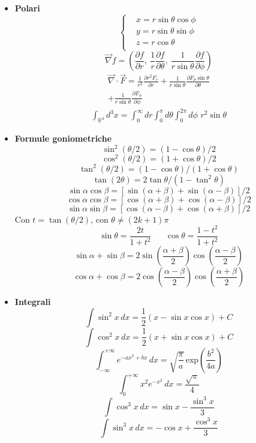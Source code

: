 \documentclass{article}
\begin{document}
\begin{footnotesize}
\begin{multicols*}{3}
\begin{itemize}[leftmargin=*]
	\item \textbf{Polari}
		\[
			\left\{\begin{aligned}
				&x= r\sin\theta \cos\phi\\ 
				&y= r\sin\theta \sin\phi \\
				&z= r\cos\theta \\
			\end{aligned}\right.
		\]
		\[\vec{\nabla} f = \left(\frac{\partial f}{\partial r},\ \frac{1}{r}\frac{\partial f}{\partial \theta },\ \frac{1}{r\sin\theta}\frac{\partial f}{\partial \phi }\right)\]
		\begin{align*}\vec{\nabla} \cdot \vec{F} = \frac{1}{r^2}\frac{\partial r^2F_r}{\partial r} + \frac{1}{r\sin\theta }\frac{\partial F_\theta \sin\theta }{\partial \theta }\\ + \frac{1}{r\sin\theta }\frac{\partial F_\phi }{\partial \phi }\end{align*}
		\begin{align*}\int_{\mathbb{R}^3}d^3x = \int_{0}^{\infty }dr \int_{0}^{\pi }d\theta  \int_{0}^{2\pi }d\phi \,\, r^2 \sin\theta \end{align*}

	\item \textbf{Formule goniometriche}
		\[\sin^2(\theta /2) = (1-\cos\theta )/2\]
		\[\cos^2(\theta /2) = (1+\cos\theta )/2\]
		\[\tan^2(\theta /2) = (1-\cos\theta )/(1+\cos\theta )\]
		\[\tan(2\theta ) = 2\tan\theta /(1-\tan^2\theta )\]
		\[\sin\alpha \cos\beta = [\sin(\alpha +\beta )+\sin(\alpha -\beta )]/2\]
		\[\cos\alpha \cos\beta = [\cos(\alpha +\beta )+\cos(\alpha -\beta )]/2\]
		\[\sin\alpha \sin\beta = [\cos(\alpha -\beta )+\cos(\alpha +\beta )]/2\]
		Con $t=\tan(\theta  /2)$, con $\theta \neq (2k+1)\pi $
		\[\sin\theta = \frac{2t}{1+t^2} \hspace{20pt}\cos\theta = \frac{1-t^2}{1+t^2}\]
		\[\sin\alpha +\sin\beta  = 2\sin\left(\frac{\alpha +\beta }{2}\right)\cos\left(\frac{\alpha -\beta }{2}\right)\]
		\[\cos\alpha +\cos\beta  = 2\cos\left(\frac{\alpha -\beta }{2}\right)\cos\left(\frac{\alpha +\beta }{2}\right)\]

	\item \textbf{Integrali}
		\[\int \sin^2 x \,dx = \frac{1}{2}(x-\sin x\cos x) + C\]
		\[\int \cos^2 x \,dx = \frac{1}{2}(x+\sin x\cos x) + C\]
		\[\int_{-\infty }^{+\infty } e^{-ax^2+bx}\,dx = \sqrt{\frac{\pi }{a}}\, \mathrm{exp}\left(\frac{b^2}{4a}\right)\]
		\[\int_{0}^{+\infty }x^2e^{-x^2}\,dx = \frac{\sqrt{\pi }}{4}\]
		\[\int \cos^3 x \,dx = \sin x - \frac{\sin^3 x}{3}\]
		\[\int \sin^3 x \,dx =-\cos x + \frac{\cos^3 x}{3}\]


\end{itemize}
\end{multicols*}
\end{footnotesize}
\end{document}
